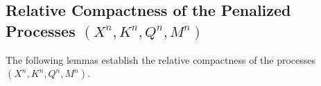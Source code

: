 \documentclass[11pt,amsfonts]{article}
\theoremstyle{plain}
\newtheorem{remark}{Remark}
\theoremstyle{assumpstyle}
\numberwithin{equation}{section}
\numberwithin{theorem}{section}
\numberwithin{proposition}{section}
\numberwithin{definition}{section}
\numberwithin{remark}{section}
\numberwithin{corollary}{section}
\numberwithin{lemma}{section}
\begin{document}
\subsection{Relative Compactness of the Penalized Processes $(X^n, K^n, Q^n, M^n)$}\label{subsection 4.1}
The following lemmas establish the relative compactness of the processes $(X^n, K^n, Q^n, M^n)$.
\end{document}
